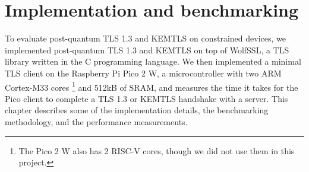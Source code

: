 \documentclass[letterpaper,12pt,titlepage,oneside,final]{book}
\begin{document}



\chapter{Implementation and benchmarking}\label{sec:implementation-and-benchmarking}
To evaluate post-quantum TLS 1.3 and KEMTLS on constrained devices, we implemented post-quantum TLS 1.3 and KEMTLS on top of WolfSSL, a TLS library written in the C programming language. We then implemented a minimal TLS client on the Raspberry Pi Pico 2 W, a microcontroller with two ARM Cortex-M33 cores \footnote{The Pico 2 W also has 2 RISC-V cores, though we did not use them in this project.} and 512kB of SRAM, and measures the time it takes for the Pico client to complete a TLS 1.3 or KEMTLS handshake with a server. This chapter describes some of the implementation details, the benchmarking methodology, and the performance measurements.
\end{document}
